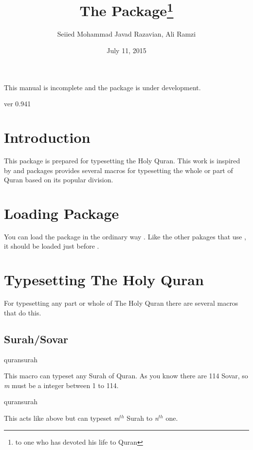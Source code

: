 \documentclass{ltxdoc}
\begin{document}
\title{The  Package\footnote{to one who has devoted his life to Quran}}
\author{Seiied Mohammad Javad Razavian, Ali Ramzi\\}

\date{July 11, 2015}
\maketitle

\begin{framed}
This manual is incomplete and the package is under development. \par 
\centerline{ver 0.941}
\end{framed}

\tableofcontents

\section{Introduction}
This package is prepared for typesetting the Holy Quran. This work is inspired by  and 
 packages provides several macros for
typesetting the whole or part of Quran based on its popular division.

\section{Loading Package}
You can load the package in the ordinary way
.
Like the other pakages that use , it should be loaded just before .

\section{Typesetting The Holy Quran}
For typesetting any part or whole of The Holy Quran there are several macros that do this.

\subsection{Surah/Sovar}
\begin{declcs}{quransurah}
\end{declcs}
This macro can typeset any Surah of Quran. As you know there are 114 Sovar, so \textit{m} must be a integer between
1 to 114. 

\begin{declcs}{quransurah}
\end{declcs}
This acts like above but can typeset \textit{m}$^{th}$ Surah to \textit{n}$^{th}$  one. 
\end{document}
